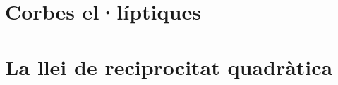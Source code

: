 \documentclass[11pt,fleqn]{book} %
\newcounter{let} \setcounter{let}{0}
\renewcommand{\1}{\mathbf{1}}
\newcommand{\0}{\mathbf{0}}
\begin{document}
\chapter{Corbes el·líptiques}
{
\let\paragraph\subsubsection
\let\subsubsection\subsection
\let\subsection\section


}
\chapter{La llei de reciprocitat quadràtica}
{
\let\paragraph\subsubsection
\let\subsubsection\subsection
\let\subsection\section


}
\end{document}
